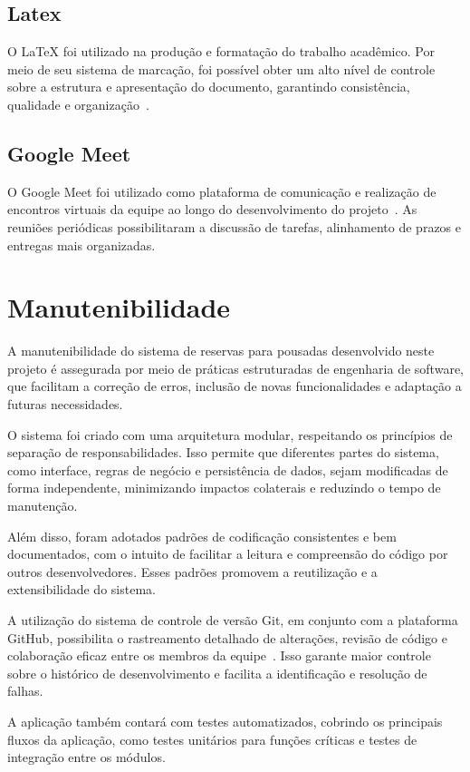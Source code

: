 \documentclass[
	12pt,				%
	openany,			%
	twoside,			%
	a4paper,			%
	english,			%
	french,				%
	spanish,			%
	brazil				%
	]{abntex2}
\begin{document}
\subsection{Latex}
O LaTeX foi utilizado na produção e formatação do trabalho acadêmico. Por meio de seu sistema de marcação, foi possível obter um alto nível de controle sobre a estrutura e apresentação do documento, garantindo consistência, qualidade e organização~\cite{latex-project}.

\subsection{Google Meet}
O Google Meet foi utilizado como plataforma de comunicação e realização de encontros virtuais da equipe ao longo do desenvolvimento do projeto~\cite{google-meet}. As reuniões periódicas possibilitaram a discussão de tarefas, alinhamento de prazos e entregas mais organizadas.

\section{Manutenibilidade}
A manutenibilidade do sistema de reservas para pousadas desenvolvido neste projeto é assegurada por meio de práticas estruturadas de engenharia de software, que facilitam a correção de erros, inclusão de novas funcionalidades e adaptação a futuras necessidades.

O sistema foi criado com uma arquitetura modular, respeitando os princípios de separação de responsabilidades. Isso permite que diferentes partes do sistema, como interface, regras de negócio e persistência de dados, sejam modificadas de forma independente, minimizando impactos colaterais e reduzindo o tempo de manutenção.

Além disso, foram adotados padrões de codificação consistentes e bem documentados, com o intuito de facilitar a leitura e compreensão do código por outros desenvolvedores. Esses padrões promovem a reutilização e a extensibilidade do sistema.

A utilização do sistema de controle de versão Git, em conjunto com a plataforma GitHub, possibilita o rastreamento detalhado de alterações, revisão de código e colaboração eficaz entre os membros da equipe~\cite{github-doc}. Isso garante maior controle sobre o histórico de desenvolvimento e facilita a identificação e resolução de falhas.

A aplicação também contará com testes automatizados, cobrindo os principais fluxos da aplicação, como testes unitários para funções críticas e testes de integração entre os módulos.
\end{document}
